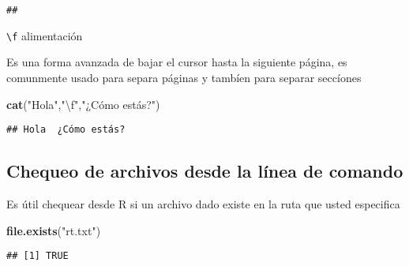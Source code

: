 \documentclass[]{article}
\newenvironment{Shaded}{\begin{snugshade}}{\end{snugshade}}
\newcommand{\KeywordTok}[1]{\textcolor[rgb]{0.13,0.29,0.53}{\textbf{#1}}}
\newcommand{\CharTok}[1]{\textcolor[rgb]{0.31,0.60,0.02}{#1}}
\newcommand{\StringTok}[1]{\textcolor[rgb]{0.31,0.60,0.02}{#1}}
\newcommand{\NormalTok}[1]{#1}
\begin{document}
\begin{verbatim}
## 
\end{verbatim}

\texttt{\textbackslash{}f} alimentación

Es una forma avanzada de bajar el cursor hasta la siguiente página, es
comunmente usado para separa páginas y tambíen para separar seccíones

\begin{Shaded}
\begin{Highlighting}[]
\KeywordTok{cat}\NormalTok{(}\StringTok{"Hola"}\NormalTok{,}\StringTok{"}\CharTok{\textbackslash{}f}\StringTok{"}\NormalTok{,}\StringTok{"¿Cómo estás?"}\NormalTok{)}
\end{Highlighting}
\end{Shaded}

\begin{verbatim}
## Hola  ¿Cómo estás?
\end{verbatim}

\subsection{Chequeo de archivos desde la línea de
comando}\label{chequeo-de-archivos-desde-la-luxednea-de-comando}

Es útil chequear desde R si un archivo dado existe en la ruta que usted
especifica

\begin{Shaded}
\begin{Highlighting}[]
\KeywordTok{file.exists}\NormalTok{(}\StringTok{"rt.txt"}\NormalTok{)}
\end{Highlighting}
\end{Shaded}

\begin{verbatim}
## [1] TRUE
\end{verbatim}
\end{document}
